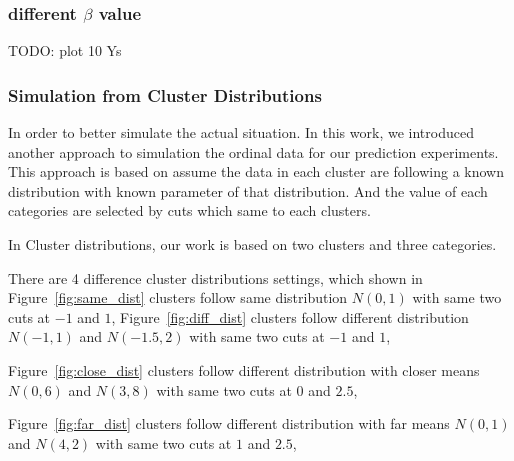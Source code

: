 \documentclass{article}
\begin{document}
\subsubsection*{different $\beta$ value}
TODO: plot 10 Ys

\subsubsection{Simulation from Cluster Distributions}

In order to better simulate the actual situation.
In this work, we introduced another approach to simulation the ordinal data 
for our prediction experiments. 
This approach is based on assume the data in each cluster are following 
a known distribution with known parameter of that distribution.
And the value of each categories are selected by cuts which same to each clusters.

In Cluster distributions, our work is based on two clusters and three categories.

There are 4 difference cluster distributions settings, which shown in 
Figure~\ref*{fig:same_dist} clusters follow same distribution $N(0, 1)$ 
with same two cuts at $-1$ and $1$,
Figure~\ref*{fig:diff_dist} clusters follow different distribution $N(-1,1)$ and $N(-1.5,2)$
with same two cuts at $-1$ and $1$,

Figure~\ref*{fig:close_dist} clusters follow different distribution with closer means $N(0,6)$ and $N(3,8)$
with same two cuts at $0$ and $2.5$,

Figure~\ref*{fig:far_dist} clusters follow different distribution with far means $N(0,1)$ and $N(4,2)$
with same two cuts at $1$ and $2.5$,
\end{document}
